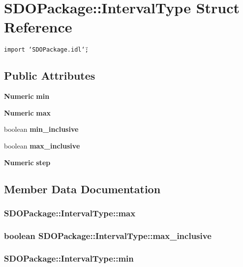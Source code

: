 \section{SDOPackage::Interval\-Type Struct Reference}
\label{structSDOPackage_1_1IntervalType}
{\tt import \char`\"{}SDOPackage.idl\char`\"{};}

\subsection*{Public Attributes}
\begin{CompactItemize}
\item 
{\bf Numeric} {\bf min}
\item 
{\bf Numeric} {\bf max}
\item 
boolean {\bf min\_\-inclusive}
\item 
boolean {\bf max\_\-inclusive}
\item 
{\bf Numeric} {\bf step}
\end{CompactItemize}


\subsection{Member Data Documentation}
\subsubsection{ {\bf SDOPackage::Interval\-Type::max}}\label{structSDOPackage_1_1IntervalType_SDOPackage_1_1IntervalTypeo1}


\subsubsection{\setlength{\rightskip}{0pt plus 5cm}boolean {\bf SDOPackage::Interval\-Type::max\_\-inclusive}}\label{structSDOPackage_1_1IntervalType_SDOPackage_1_1IntervalTypeo3}


\subsubsection{ {\bf SDOPackage::Interval\-Type::min}}\label{structSDOPackage_1_1IntervalType_SDOPackage_1_1IntervalTypeo0}


